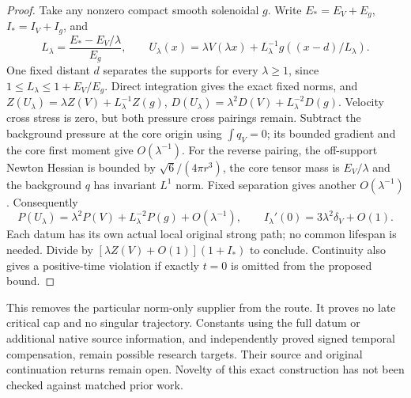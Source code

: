 \documentclass[11pt]{article}
\begin{document}
\begin{proof}
Take any nonzero compact smooth solenoidal $g$. Write
$E_*=E_V+E_g$, $I_*=I_V+I_g$, and
\[
 L_\lambda=\frac{E_*-E_V/\lambda}{E_g},\qquad
 U_\lambda(x)=\lambda V(\lambda x)
       +L_\lambda^{-1}g((x-d)/L_\lambda).
\]
One fixed distant $d$ separates the supports for every $\lambda\ge1$,
since $1\le L_\lambda\le1+E_V/E_g$. Direct integration gives the exact
fixed norms, and
$Z(U_\lambda)=\lambda Z(V)+L_\lambda^{-1}Z(g)$,
$D(U_\lambda)=\lambda^2D(V)+L_\lambda^{-2}D(g)$.
Velocity cross stress is zero, but both pressure cross pairings remain.
Subtract the background pressure at the core origin using $\int q_V=0$;
its bounded gradient and the core first moment give $O(\lambda^{-1})$.
For the reverse pairing, the off-support Newton Hessian is bounded by
$\sqrt6/(4\pi r^3)$, the core tensor mass is $E_V/\lambda$ and the
background $q$ has invariant $L^1$ norm. Fixed separation gives another
$O(\lambda^{-1})$. Consequently
\[
 P(U_\lambda)=\lambda^2P(V)+L_\lambda^{-2}P(g)+O(\lambda^{-1}),\qquad
 I_\lambda'(0)=3\lambda^2\delta_V+O(1).
\]
Each datum has its own actual local original strong path; no common
lifespan is needed. Divide by $[\lambda Z(V)+O(1)](1+I_*)$ to conclude.
Continuity also gives a positive-time violation if exactly $t=0$ is
omitted from the proposed bound.
\end{proof}

This removes the particular norm-only supplier from the route. It proves
no late critical cap and no singular trajectory. Constants using the
full datum or additional native source information, and independently
proved signed temporal compensation, remain possible research targets.
Their source and original continuation returns remain open. Novelty of
this exact construction has not been checked against matched prior work.
\end{document}
